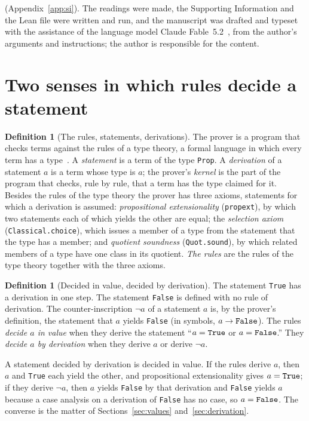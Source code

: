 \documentclass[11pt]{article}
\theoremstyle{definition}
\newtheorem{definition}[theorem]{Definition}
\theoremstyle{remark}
\DeclareRobustCommand{\lean}[1]{{\renewcommand{\_}{\textunderscore\allowbreak}\texttt{#1}}}
\newcommand{\True}{\lean{True}}
\newcommand{\False}{\lean{False}}
\begin{document}
(Appendix~\ref{app:si}). The readings were made, the Supporting Information and the Lean file were written and run, and the manuscript was drafted and typeset with the assistance of the language model Claude Fable~5.2~\citep{claude}, from the author's arguments and instructions; the author is responsible for the content.

\section{Two senses in which rules decide a statement}\label{sec:two}

\begin{definition}[The rules, statements, derivations]\label{def:rules}
The prover is a program that checks terms against the rules of a type theory, a formal language in which every term has a type~\citep{lean4,carneiro}. A \emph{statement} is a term of the type \lean{Prop}. A \emph{derivation} of a statement $a$ is a term whose type is $a$; the prover's \emph{kernel} is the part of the program that checks, rule by rule, that a term has the type claimed for it. Besides the rules of the type theory the prover has three axioms, statements for which a derivation is assumed: \emph{propositional extensionality} (\lean{propext}), by which two statements each of which yields the other are equal; the \emph{selection axiom} (\lean{Classical.choice}), which issues a member of a type from the statement that the type has a member; and \emph{quotient soundness} (\lean{Quot.sound}), by which related members of a type have one class in its quotient. \emph{The rules} are the rules of the type theory together with the three axioms.
\end{definition}

\begin{definition}[Decided in value, decided by derivation]\label{def:decided}
The statement \True{} has a derivation in one step. The statement \False{} is defined with no rule of derivation. The counter-inscription $\neg a$ of a statement $a$ is, by the prover's definition, the statement that $a$ yields \False{} (in symbols, $a\to\False$). The rules \emph{decide $a$ in value} when they derive the statement ``$a=\True$ or $a=\False$.'' They \emph{decide $a$ by derivation} when they derive $a$ or derive $\neg a$.
\end{definition}

A statement decided by derivation is decided in value. If the rules derive $a$, then $a$ and \True{} each yield the other, and propositional extensionality gives $a=\True$; if they derive $\neg a$, then $a$ yields \False{} by that derivation and \False{} yields $a$ because a case analysis on a derivation of \False{} has no case, so $a=\False$. The converse is the matter of Sections~\ref{sec:values} and~\ref{sec:derivation}.
\end{document}
